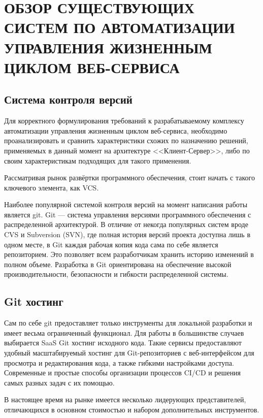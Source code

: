 \chapter{ОБЗОР СУЩЕСТВУЮЩИХ СИСТЕМ ПО АВТОМАТИЗАЦИИ УПРАВЛЕНИЯ ЖИЗНЕННЫМ ЦИКЛОМ ВЕБ-СЕРВИСА}
\label{cha:analysis}

\section{Система контроля версий}

Для корректного формулирования требований к разрабатываемому комплексу автоматизации управления жизненным циклом веб-сервиса,
необходимо проанализировать и сравнить характеристики схожих по назначению решений, применяемых в данный момент на архитектуре <<Клиент-Сервер>>,
либо по своим характеристикам подходящих для такого применения.

Рассматривая рынок развёртки программного обеспечения, стоит начать с такого ключевого элемента, как VCS.

Наиболее популярной системой контроля версий на момент написания работы является git.
Git --- система управления версиями программного обеспечения с распределенной архитектурой.
В отличие от некогда популярных систем вроде CVS и Subversion (SVN),
где полная история версий проекта доступна лишь в одном месте,
в Git каждая рабочая копия кода сама по себе является репозиторием.
Это позволяет всем разработчикам хранить историю изменений в полном объеме.
Разработка в Git ориентирована на обеспечение высокой производительности, безопасности и гибкости распределенной системы.

\section{Git хостинг}

Сам по себе git предоставляет только инструменты для локальной разработки и имеет весьма ограниченный функционал.
Для работы в большинстве случаев выбирается SaaS Git хостинг исходного кода.
Такие сервисы предоставляют удобный масштабируемый хостинг для Git-репозиториев с веб-интерфейсом для просмотра и редактирования кода,
а также гибкими настройками доступа.
Современные и простые способы организации процессов CI/CD и решения самых разных задач с их помощью.

В настоящее время на рынке имеется несколько лидерующих представителей, отличающихся в основном стоимостью и набором дополнительных инструментов\cite{web:git-reps:rating}.


